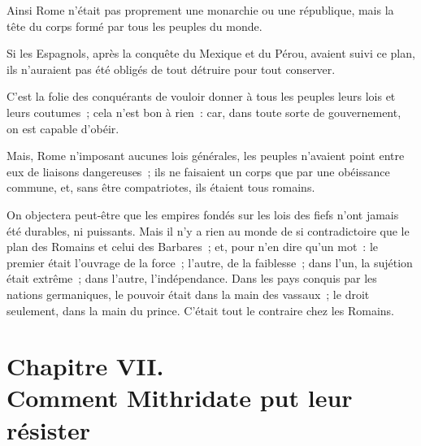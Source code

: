 \documentclass[french,twoside]{book} %
\newcommand\chapteropen{} %
\newcommand\chapterclose{} %
\begin{document}
Ainsi Rome n’était pas proprement une monarchie ou une république, mais la tête du corps formé par tous les peuples du monde.\par
Si les Espagnols, après la conquête du Mexique et du Pérou, avaient suivi ce plan, ils n’auraient pas été obligés de tout détruire pour tout conserver.\par
C’est la folie des conquérants de vouloir donner à tous les peuples leurs lois et leurs coutumes ; cela n’est bon à rien : car, dans toute sorte de gouvernement, on est capable d’obéir.\par
Mais, Rome n’imposant aucunes lois générales, les peuples n’avaient point entre eux de liaisons dangereuses ; ils ne faisaient un corps que par une obéissance commune, et, sans être compatriotes, ils étaient tous romains.\par
On objectera peut-être que les empires fondés sur les lois des fiefs n’ont jamais été durables, ni puissants. Mais il n’y a rien au monde de si contradictoire que le plan des Romains et celui des Barbares ; et, pour n’en dire qu’un mot : le premier était l’ouvrage de la force ; l’autre, de la faiblesse ; dans l’un, la sujétion était extrême ; dans l’autre, l’indépendance. Dans les pays conquis par les nations germaniques, le pouvoir était dans la main des vassaux ; le droit seulement, dans la main du prince. C’était tout le contraire chez les Romains.
\chapterclose


\chapteropen
\chapter[{Chapitre VII. Comment Mithridate put leur résister}]{Chapitre VII. \\
Comment Mithridate put leur résister}
\label{considérations\_Romains\_chap\_07}\renewcommand{\leftmark}{Chapitre VII. \\
Comment Mithridate put leur résister}
\end{document}
